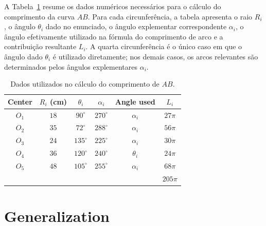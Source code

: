 \documentclass[a4paper,12pt,oneside]{article}
\numberwithin{equation}{section}
\numberwithin{equation}{section}
\begin{document}
A Tabela~\ref{tab:data} resume os dados numéricos necessários para o cálculo do comprimento da curva $AB$. Para cada circunferência, a tabela apresenta o raio $R_i$, o ângulo $\theta_i$ dado no enunciado, o ângulo explementar correspondente $\alpha_i$, o ângulo efetivamente utilizado na fórmula do comprimento de arco e a contribuição resultante $L_i$. A quarta circunferência é o único caso em que o ângulo dado $\theta_i$ é utilizado diretamente; nos demais casos, os arcos relevantes são determinados pelos ângulos explementares $\alpha_i$.
\begin{table}[ht]
\centering
\caption{Dados utilizados no cálculo do comprimento de $AB$.}
\label{tab:data}
\begin{tabular}{c c c c c c}
\hline
Center & $R_i$ (cm) & $\theta_i$ & $\alpha_i$ & Angle used & $L_i$ \\
\hline
$O_1$ & $18$ & $90^\circ$  & $270^\circ$ & $\alpha_i$ & $27\pi$ \\
$O_2$ & $35$ & $72^\circ$  & $288^\circ$ & $\alpha_i$ & $56\pi$ \\
$O_3$ & $24$ & $135^\circ$ & $225^\circ$ & $\alpha_i$ & $30\pi$ \\
$O_4$ & $36$ & $120^\circ$ & $240^\circ$ & $\theta_i$ & $24\pi$ \\
$O_5$ & $48$ & $105^\circ$ & $255^\circ$ & $\alpha_i$ & $68\pi$ \\
\hline
\multicolumn{5}{l}{} & $205\pi$ \\
\hline
\end{tabular}
\end{table}


\section{Generalization}
\end{document}
